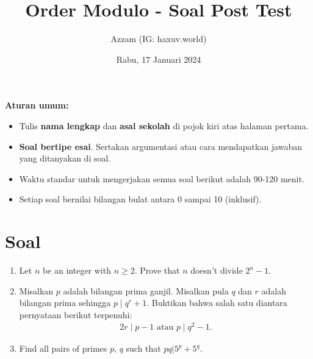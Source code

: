\documentclass[11pt]{scrartcl}
\title{Order Modulo - Soal Post Test}
\author{Azzam (IG: haxuv.world)}
\date{Rabu, 17 Januari 2024}
\begin{document}
\maketitle
\textbf{Aturan umum:}
\begin{itemize}
    \item Tulis \textbf{nama lengkap} dan \textbf{asal sekolah} di pojok kiri atas halaman pertama.
    \item \textbf{Soal bertipe esai}. Sertakan argumentasi atau cara mendapatkan jawaban yang ditanyakan di soal.
    \item Waktu standar untuk mengerjakan semua soal berikut adalah 90-120 menit.
    \item Setiap soal bernilai bilangan bulat antara 0 sampai 10 (inklusif).
\end{itemize}


\section{Soal}
\begin{enumerate}
    \item Let $n$ be an integer with $n \geq 2$. Prove that $n$ doesn’t divide $2^n-1$.
    \item Misalkan $p$ adalah bilangan prima ganjil. Misalkan pula $q$ dan $r$ adalah bilangan prima sehingga $p \mid q^r+1$. Buktikan bahwa salah satu diantara pernyataan berikut terpenuhi: 
    \begin{align*}
        2r \mid p-1 \text{ atau } p \mid q^2-1.
    \end{align*}
    \item Find all pairs of primes $p$, $q$ such that $pq | 5^p + 5^q$.
\end{enumerate}
\end{document}
